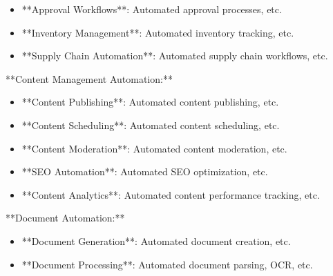 \documentclass[11pt,a4paper]{article}
\begin{document}
\begin{itemize}
\item **Approval Workflows**: Automated approval processes, etc.
\end{itemize}

\begin{itemize}
\item **Inventory Management**: Automated inventory tracking, etc.
\end{itemize}

\begin{itemize}
\item **Supply Chain Automation**: Automated supply chain workflows, etc.
\end{itemize}

**Content Management Automation:**

\begin{itemize}
\item **Content Publishing**: Automated content publishing, etc.
\end{itemize}

\begin{itemize}
\item **Content Scheduling**: Automated content scheduling, etc.
\end{itemize}

\begin{itemize}
\item **Content Moderation**: Automated content moderation, etc.
\end{itemize}

\begin{itemize}
\item **SEO Automation**: Automated SEO optimization, etc.
\end{itemize}

\begin{itemize}
\item **Content Analytics**: Automated content performance tracking, etc.
\end{itemize}

**Document Automation:**

\begin{itemize}
\item **Document Generation**: Automated document creation, etc.
\end{itemize}

\begin{itemize}
\item **Document Processing**: Automated document parsing, OCR, etc.
\end{itemize}
\end{document}
